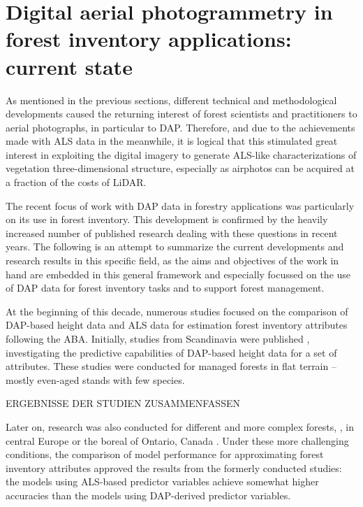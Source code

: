  





\section[DAP in forest inventory: current state]{Digital aerial photogrammetry in forest inventory applications: current state}\label{sec:DAP-current state}

As mentioned in the previous sections, different technical and methodological developments caused the returning interest
of forest scientists and practitioners to aerial photographs, in particular to \ac{DAP}. Therefore,
and due to the achievements made with \ac{ALS} data in the meanwhile, it is logical that this stimulated great interest in exploiting the 
digital imagery to generate \ac{ALS}-like characterizations of vegetation three-dimensional structure, especially as airphotos can be 
acquired at a fraction of the costs of \ac{LiDAR}.

The recent focus of work with \ac{DAP} data in forestry applications was particularly on its use in forest inventory.
This development is confirmed by the heavily increased number of published research dealing with these questions in recent years.
The following is an attempt to summarize the current developments and research results in this specific field,
as the aims and objectives of the work in hand are embedded in this general framework and 
especially focussed on the use of \ac{DAP} data for forest inventory tasks and to support forest management.
 
At the beginning of this decade, numerous studies focused on the comparison of \ac{DAP}-based height data 
and \ac{ALS} data for estimation forest inventory attributes following the \ac{ABA}. 
Initially, studies from Scandinavia were published \parencite{Bohlin.2012,Jarnstedt.2012,Nurminen.2013,Vastaranta.2013b},
investigating the predictive capabilities of \ac{DAP}-based height data for a set of attributes.
These studies were conducted for managed forests in flat terrain -- mostly even-aged stands with few species. 
 
 ERGEBNISSE DER STUDIEN ZUSAMMENFASSEN
 
 
Later on, research was also conducted for different and more complex forests, \eg, in central Europe \parencite{Straub.2013c} 
or the boreal of Ontario, Canada \parencite{Pitt.2014}. 
Under these more challenging conditions, the comparison of model performance for approximating forest inventory attributes
approved the results from the formerly conducted studies: the models using \ac{ALS}-based predictor variables
achieve somewhat higher accuracies than the models using \ac{DAP}-derived predictor variables.
  
